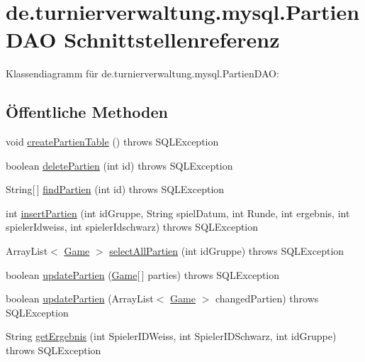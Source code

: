 \hypertarget{interfacede_1_1turnierverwaltung_1_1mysql_1_1_partien_d_a_o}{}\section{de.\+turnierverwaltung.\+mysql.\+Partien\+D\+AO Schnittstellenreferenz}
\label{interfacede_1_1turnierverwaltung_1_1mysql_1_1_partien_d_a_o}


Klassendiagramm für de.\+turnierverwaltung.\+mysql.\+Partien\+D\+AO\+:
\subsection*{Öffentliche Methoden}
\begin{DoxyCompactItemize}
\item 
void \hyperlink{interfacede_1_1turnierverwaltung_1_1mysql_1_1_partien_d_a_o_ae03cb0923895512c41a081589b284cb1}{create\+Partien\+Table} ()  throws S\+Q\+L\+Exception
\item 
boolean \hyperlink{interfacede_1_1turnierverwaltung_1_1mysql_1_1_partien_d_a_o_aae8479877d2e0827109ca985519a39ff}{delete\+Partien} (int id)  throws S\+Q\+L\+Exception
\item 
String\mbox{[}$\,$\mbox{]} \hyperlink{interfacede_1_1turnierverwaltung_1_1mysql_1_1_partien_d_a_o_a7e5d640ad926f5e4d600249bad0b0977}{find\+Partien} (int id)  throws S\+Q\+L\+Exception
\item 
int \hyperlink{interfacede_1_1turnierverwaltung_1_1mysql_1_1_partien_d_a_o_a4a718eb505fe285eb27802de942cfd75}{insert\+Partien} (int id\+Gruppe, String spiel\+Datum, int Runde, int ergebnis, int spieler\+Idweiss, int spieler\+Idschwarz)  throws S\+Q\+L\+Exception
\item 
Array\+List$<$ \hyperlink{classde_1_1turnierverwaltung_1_1model_1_1_game}{Game} $>$ \hyperlink{interfacede_1_1turnierverwaltung_1_1mysql_1_1_partien_d_a_o_a05823203f155d10f2123cdf42b3590ba}{select\+All\+Partien} (int id\+Gruppe)  throws S\+Q\+L\+Exception
\item 
boolean \hyperlink{interfacede_1_1turnierverwaltung_1_1mysql_1_1_partien_d_a_o_a1ad8c491128fbb314014e8c95747611c}{update\+Partien} (\hyperlink{classde_1_1turnierverwaltung_1_1model_1_1_game}{Game}\mbox{[}$\,$\mbox{]} parties)  throws S\+Q\+L\+Exception
\item 
boolean \hyperlink{interfacede_1_1turnierverwaltung_1_1mysql_1_1_partien_d_a_o_a0cf9b8ac8173ef8e45b90e89a090d5ed}{update\+Partien} (Array\+List$<$ \hyperlink{classde_1_1turnierverwaltung_1_1model_1_1_game}{Game} $>$ changed\+Partien)  throws S\+Q\+L\+Exception
\item 
String \hyperlink{interfacede_1_1turnierverwaltung_1_1mysql_1_1_partien_d_a_o_a41156c089fd9c62dcdd5d4cf318b33ca}{get\+Ergebnis} (int Spieler\+I\+D\+Weiss, int Spieler\+I\+D\+Schwarz, int id\+Gruppe)  throws S\+Q\+L\+Exception
\end{DoxyCompactItemize}



